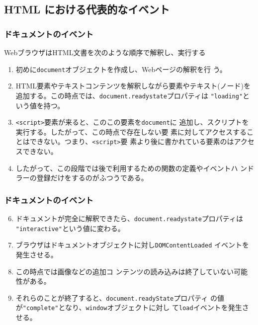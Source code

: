 \subsection{HTML における代表的なイベント}
\begin{frame}[containsverbatim]
\frametitle{ドキュメントのイベント}
WebブラウザはHTML文書を次のような順序で解釈し、実行する
\begin{enumerate}
 \item 初めに\texttt{document}オブジェクトを作成し、Webページの解釈を行
       う。
 \item HTML要素やテキストコンテンツを解釈しながら要素やテキスト(ノード)を
       追加する。この時点では、\texttt{document.readystate}プロパティは
       \texttt{"loading"}という値を持つ。
 \item \texttt{<script>}要素が来ると、このこの要素を\texttt{document}に
       追加し、スクリプトを実行する。したがって、この時点で存在しない要
       素に対してアクセスすることはできない。つまり、\texttt{<script>}要
       素より後に書かれている要素のはアクセスできない。
 \item したがって、この段階では後で利用するための関数の定義やイベントハ
       ンドラーの登録だけをするのがふつうである。
\end{enumerate}
\end{frame}
\begin{frame}[containsverbatim]
\frametitle{ドキュメントのイベント}
\begin{enumerate}\setcounter{enumi}{5}
 \item ドキュメントが完全に解釈できたら、\texttt{document.readystate}プロパティは
       \texttt{"interactive"}という値に変わる。
 \item ブラウザはドキュメントオブジェクトに対し\texttt{DOMContentLoaded}
       イベントを発生させる。
 \item この時点では画像などの追加コ
       ンテンツの読み込みは終了していない可能性がある。
 \item それらのことが終了すると、\texttt{document.readyState}プロパティ
       の値が\texttt{"complete"}となり、\texttt{window}オブジェクトに対し
       て\texttt{load}イベントを発生させる。
\end{enumerate}
\end{frame}
